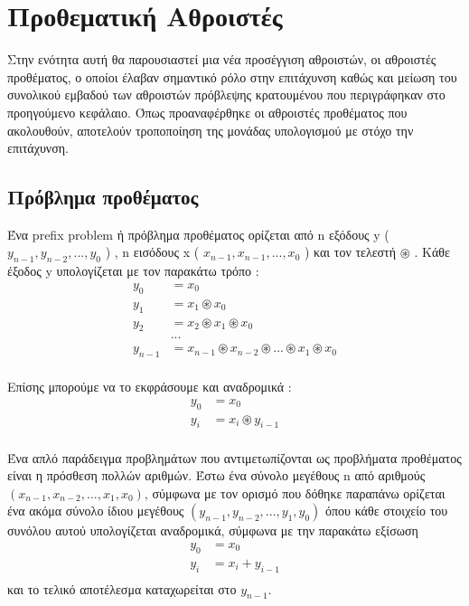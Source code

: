 \section{Προθεματική Αθροιστές}
Στην ενότητα αυτή θα παρουσιαστεί μια νέα προσέγγιση αθροιστών, οι αθροιστές προθέματος,
ο οποίοι έλαβαν σημαντικό ρόλο στην επιτάχυνση καθώς και μείωση του συνολικού εμβαδού 
των αθροιστών πρόβλεψης κρατουμένου που περιγράφηκαν στο προηγούμενο κεφάλαιο. Όπως προαναφέρθηκε οι αθροιστές προθέματος που ακολουθούν, αποτελούν τροποποίηση της μονάδας υπολογισμού με στόχο την επιτάχυνση.





\subsection{Πρόβλημα προθέματος}

Ένα prefix problem ή πρόβλημα προθέματος 
ορίζεται από n εξόδους y ( $y_{n-1},y_{n-2}, ... ,y_0 $ ) , n εισόδους x ( $x_{n-1},x_{n-1}, ... ,x_0 $ ) και τον τελεστή $\circledast$ .
Κάθε έξοδος y υπολογίζεται με τον παρακάτω τρόπο :
\begin{equation}
\begin{split}
y_0 &= x_0\\
y_1 &= x_1 \circledast x_0\\
y_2 &= x_2 \circledast x_1 \circledast x_0\\
&...\\
y_{n-1} &= x_{n-1} \circledast x_{n-2} \circledast ... \circledast x_{1} \circledast x_0\\
\end{split}
\end{equation}

Επίσης μπορούμε να το εκφράσουμε και αναδρομικά :
\begin{equation}
\begin{split}
y_0 &= x_0\\
y_{i} &= x_{i} \circledast y_{i-1}\\
\end{split}
\end{equation}

Ένα απλό παράδειγμα προβλημάτων που αντιμετωπίζονται ως προβλήματα προθέματος είναι 
η πρόσθεση πολλών αριθμών. Έστω ένα σύνολο μεγέθους n από αριθμούς 
$(x_{n-1},x_{n-2}, ... ,x_1,x_0)$, σύμφωνα με τον ορισμό που δόθηκε παραπάνω
ορίζεται ένα ακόμα σύνολο ίδιου μεγέθους $(y_{n-1},y_{n-2}, ... ,y_1,y_0)$ 
όπου κάθε στοιχείο του συνόλου αυτού υπολογίζεται αναδρομικά, σύμφωνα με την παρακάτω εξίσωση
\begin{equation*}
\begin{split}
y_0 &= x_0\\
y_{i} &= x_{i} + y_{i-1}\\
\end{split}
\end{equation*}
και το τελικό αποτέλεσμα καταχωρείται στο $y_{n-1}$.

